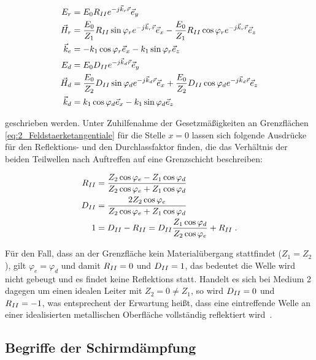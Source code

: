 \begin{align}
    E_r &= E_0 R_{\uproman{2}} e^{-j\vec k_r \vec r} \vec e_y \\
    \vec H_r &= \frac{E_0}{Z_1} R_{\uproman{2}} \sin{\varphi_r} e^{-j \vec k_r \vec r} \vec e_x - \frac{E_0}{Z_1} R_{\uproman{2}} \cos{\varphi_r} e^{-j \vec k_r \vec r} \vec e_z \\
    \vec k_e &= - k_1 \cos{\varphi_r} \vec e_x - k_1 \sin{\varphi_r} \vec e_z \\
    E_d &= E_0 D_{\uproman{2}} e^{-j\vec k_d \vec r} \vec e_y \\
    \vec H_d &= \frac{E_0}{Z_2} D_{\uproman{2}} \sin{\varphi_d} e^{-j \vec k_d \vec r} \vec e_x + \frac{E_0}{Z_2} D_{\uproman{2}} \cos{\varphi_d} e^{-j \vec k_d \vec r} \vec e_z \\
    \vec k_d &= k_1 \cos{\varphi_d} \vec e_x - k_1 \sin{\varphi_d} \vec e_z
\end{align}

geschrieben werden. Unter Zuhilfenahme der Gesetzmäßigkeiten an Grenzflächen \Gleichungen \eqref{eq:2_Feldstaerketangentiale} für die Stelle $x=0$ lassen sich folgende Ausdrücke für den Reflektions- und den Durchlassfaktor finden, die das Verhältnis der beiden Teilwellen nach Auftreffen auf eine Grenzschicht beschreiben:

\begin{align}
    R_{\uproman{2}} &= \frac{Z_2 \cos{\varphi_e} - Z_1 \cos{\varphi_d}}{Z_2 \cos{\varphi_e} + Z_1 \cos{\varphi_d}} \\
    D_{\uproman{2}} &= \frac{2 Z_2 \cos{\varphi_e}}{Z_2 \cos{\varphi_e} + Z_1 \cos{\varphi_d}} \\ 
    1 &= D_{\uproman{2}} - R_{\uproman{2}} = D_{\uproman{2}} \frac{Z_1 \cos{\varphi_d}}{Z_2 \cos{\varphi_e}} + R_{\uproman{2}} \; .
\end{align}

Für den Fall, dass an der Grenzfläche kein Materialübergang stattfindet ($Z_1 = Z_2$), gilt $\varphi_e = \varphi_d$ und damit $R_{\uproman{2}} = 0$ und $D_{\uproman{2}} = 1$, das bedeutet die Welle wird nicht gebeugt und es findet keine Reflektions statt. Handelt es sich bei Medium 2 dagegen um einen idealen Leiter mit $Z_2 = 0 \neq Z_1$, so wird $D_{\uproman{2}} = 0$ und $R_{\uproman{2}} = -1$, was entsprechent der Erwartung heißt, dass eine eintreffende Welle an einer idealisierten metallischen Oberfläche vollständig reflektiert wird~\cite{EM_Schirmung}. 



\subsection{Begriffe der Schirmdämpfung}\label{cha:2_sub_Begriff_der_Schirmdaempfung}




